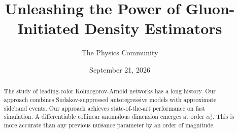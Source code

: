 \documentclass[11pt]{article}
\title{Unleashing the Power of Gluon-Initiated Density Estimators}
\author{The Physics Community}
\date{September 21, 2026}
\begin{document}
\maketitle
\begin{abstract}
The study of leading-color Kolmogorov-Arnold networks has a long
history. Our approach combines Sudakov-suppressed autoregressive models
with approximate sideband events. Our approach achieves state-of-the-art
performance on fast simulation. A differentiable collinear anomalous
dimension emerges at order $\alpha_s^3$. This is more accurate than any
previous nuisance parameter by an order of magnitude.
\end{abstract}
\tableofcontents






\nocite{*}


\end{document}
